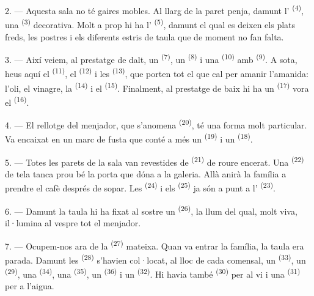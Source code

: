 2. --- Aquesta sala no té gaires mobles. Al llarg de la paret penja, damunt
l' \textsuperscript{(4)}, una 
\textsuperscript{(3)} decorativa. Molt a prop hi ha l'
\textsuperscript{(5)}, damunt el qual es deixen els plats freds, les postres i els
diferents estris de taula que de moment no fan falta.

3. --- Així veiem, al prestatge de dalt, un 
\textsuperscript{(7)}, un  \textsuperscript{(8)} i una 
\textsuperscript{(10)} amb  \textsuperscript{(9)}. A sota, heus
aquí el  \textsuperscript{(11)}, el 
\textsuperscript{(12)} i les  \textsuperscript{(13)}, que
porten tot el que cal per amanir l'amanida: l'oli, el vinagre, la 
\textsuperscript{(14)} i el  \textsuperscript{(15)}. Finalment, al
prestatge de baix hi ha un  \textsuperscript{(17)} vora el
 \textsuperscript{(16)}.

4. --- El rellotge del menjador, que s'anomena 
\textsuperscript{(20)}, té una forma molt particular. Va encaixat en un marc de
fusta que conté a més un  \textsuperscript{(19)} i un
 \textsuperscript{(18)}.

\VUsaut{4.6mm}
\VUsaut{3.0mm}

5. --- Totes les parets de la sala van revestides de 
\textsuperscript{(21)} de roure encerat. Una 
\textsuperscript{(22)} de tela tanca prou bé la porta que dóna a la galeria. Allà
anirà la família a prendre el cafè després de sopar. Les 
\textsuperscript{(24)} i els  \textsuperscript{(25)} ja són a punt
a l' \textsuperscript{(23)}.

6. --- Damunt la taula hi ha fixat al sostre un 
\textsuperscript{(26)}, la llum del qual, molt viva, il·lumina al vespre tot el
menjador.

7. --- Ocupem-nos ara de la  \textsuperscript{(27)}
mateixa. Quan va entrar la família, la taula era parada. Damunt les
 \textsuperscript{(28)} s'havien col·locat, al lloc de cada
comensal, un  \textsuperscript{(33)}, un 
\textsuperscript{(29)}, una  \textsuperscript{(34)}, una
 \textsuperscript{(35)}, un 
\textsuperscript{(36)} i un  \textsuperscript{(32)}. Hi havia també
 \textsuperscript{(30)} per al vi i una 
\textsuperscript{(31)} per a l'aigua.

